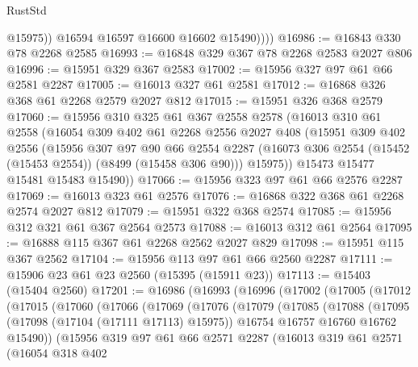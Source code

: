 \begin{lexlean}{RustStd}
\begin{coremodule}
                @15975))
            @16594
            @16597
            @16600
            @16602
            @15490))))
@16986 := @16843 @330 @78 @2268 @2585
@16993 := @16848 @329 @367 @78 @2268 @2583 @2027 @806
@16996 := @15951 @329 @367 @2583
@17002 := @15956 @327 @97 @61 @66 @2581 @2287
@17005 := @16013 @327 @61 @2581
@17012 := @16868 @326 @368 @61 @2268 @2579 @2027 @812
@17015 := @15951 @326 @368 @2579
@17060 := @15956
    @310
    @325
    @61
    @367
    @2558
    @2578
    (@16013
      @310
      @61
      @2558
      (@16054
        @309
        @402
        @61
        @2268
        @2556
        @2027
        @408
        (@15951
          @309
          @402
          @2556
          (@15956
            @307
            @97
            @90
            @66
            @2554
            @2287
            (@16073 @306 @2554 (@15452 (@15453 @2554)) (@8499 (@15458 @306 @90)))
            @15975))
        @15473
        @15477
        @15481
        @15483
        @15490))
@17066 := @15956 @323 @97 @61 @66 @2576 @2287
@17069 := @16013 @323 @61 @2576
@17076 := @16868 @322 @368 @61 @2268 @2574 @2027 @812
@17079 := @15951 @322 @368 @2574
@17085 := @15956 @312 @321 @61 @367 @2564 @2573
@17088 := @16013 @312 @61 @2564
@17095 := @16888 @115 @367 @61 @2268 @2562 @2027 @829
@17098 := @15951 @115 @367 @2562
@17104 := @15956 @113 @97 @61 @66 @2560 @2287
@17111 := @15906 @23 @61 @23 @2560 (@15395 (@15911 @23))
@17113 := @15403 (@15404 @2560)
@17201 := @16986
    (@16993
      (@16996
        (@17002
          (@17005
            (@17012
              (@17015
                (@17060
                  (@17066
                    (@17069
                      (@17076
                        (@17079
                          (@17085
                            (@17088
                              (@17095
                                (@17098 (@17104 (@17111 @17113) @15975))
                                @16754
                                @16757
                                @16760
                                @16762
                                @15490))
                            (@15956
                              @319
                              @97
                              @61
                              @66
                              @2571
                              @2287
                              (@16013
                                @319
                                @61
                                @2571
                                (@16054
                                  @318
                                  @402

\end{coremodule}
\end{lexlean}
